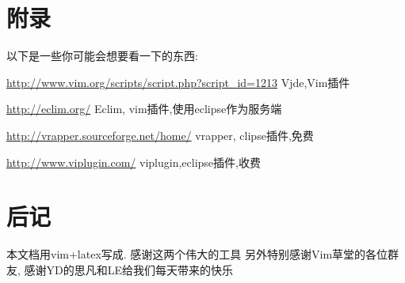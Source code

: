 \documentclass[oneside,openany]{book}
\begin{document}
\chapter{附录}
  以下是一些你可能会想要看一下的东西:
  \newline

  \href{http://www.vim.org/scripts/script.php?script\_id=1213}{http://www.vim.org/scripts/script.php?script\_id=1213} 
  Vjde,Vim插件
  \newline

  \href{http://eclim.org/}{http://eclim.org/} Eclim, vim插件,使用eclipse作为服务端
  \newline

  \href{http://vrapper.sourceforge.net/home/}{http://vrapper.sourceforge.net/home/}
  vrapper, clipse插件,免费
  \newline

  \href{http://www.viplugin.com/}{http://www.viplugin.com/}
  viplugin,eclipse插件,收费
  \newline

\chapter{后记}
    本文档用vim+latex写成. 感谢这两个伟大的工具
   \newline
   另外特别感谢Vim草堂的各位群友, 感谢YD的思凡和LE给我们每天带来的快乐
   
   
\end{document}
